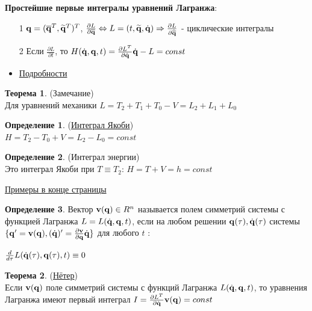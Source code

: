 \documentclass[specialist, subf, href, colorlinks=true, 12pt, times, mtpro, final]{disser}
\theoremstyle{definition}
\newtheorem{defn}{Определение}[section]
\newtheorem{theorem}{Теорема}[section]
\begin{document}
    \textbf{Простейшие первые интегралы уравнений Лагранжа}:
    \begin{itemize}
    \item[1] $\mathbf{q} = (\overline{\mathbf{q}}^T, \widetilde{\mathbf{q}}^T)^T$, $\frac{\partial L}{\partial \overline{\mathbf{q}}} \Leftrightarrow L=(t, \widetilde{\mathbf{q}}, \dot{\mathbf{q}}) \Rightarrow \frac{\partial L}{\partial \dot{\overline{\mathbf{q}}}}$ - циклические интегралы
    \item[2] Если $\frac{\partial L}{\partial t}$, то $H(\dot{\mathbf{q}}, \mathbf{q}, t) = \frac{\partial L^T}{\partial \dot{\mathbf{q}}} \dot{\mathbf{q}} - L = const$
    \item \hyperlink {lects.1}{Подробности} 
    \end{itemize}
    
    \begin{theorem}(Замечание)\\
   		Для уравнений механики $L = T_2+T_1+T_0-V=L_2+L_1+L_0$
    \end{theorem}
    \begin{defn} (\hyperlink {lects.1}{Интеграл Якоби})\\
    	$H=T_2-T_0+V=L_2-L_0=const$ 
    \end{defn}
    \begin{defn} (Интеграл энергии)\\
    	Это интеграл Якоби при $T \equiv T_2$: $H=T+V=h=const$\\
    \end{defn}
    
    \noindent\hyperlink {lects.1}{Примеры в конце страницы}\\
    
    \begin{defn}
    	Вектор $\mathbf{v}(\mathbf{q}) \in R^n$ называется полем симметрий системы с функцией Лагранжа $L=L(\dot{\mathbf{q}}, \mathbf{q}, t)$, если на любом решении $\mathbf{q}(\tau), \dot{\mathbf{q}}(\tau)$ системы $\{\mathbf{q}' = \mathbf{v}(\mathbf{q}), (\dot{\mathbf{q}})'=\frac{\partial \mathbf{v}}{\partial \mathbf{q}} \dot{\mathbf{q}}\}$ для любого $t$ :\\
    	\begin{center}
    	$\frac{d}{d\tau} L (\dot{\mathbf{q}}(\tau), \mathbf{q}(\tau), t) \equiv 0$
    	\end{center}
    \end{defn}
    
    \begin{theorem}(\hyperlink {lects.2}{Нётер})\\
    Если $\mathbf{v}(\mathbf{q})$ поле симметрий системы с функций Лагранжа $L(\dot{\mathbf{q}}, \mathbf{q}, t)$, то уравнения Лагранжа имеют первый интеграл $I=\frac{\partial L^T}{\partial \dot{\mathbf{q}}} \mathbf{v}(\mathbf{q}) = const$
    \end{theorem}
    
\end{document}
